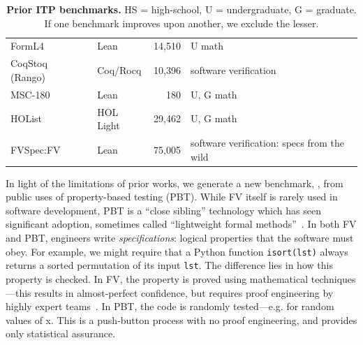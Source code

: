 \begin{table}[h]
\begin{tabularx}{\textwidth}{@{}
    >{\raggedright\arraybackslash}p{3.3cm}
    l
    r
    >{\raggedright\arraybackslash}X@{}}
FormL4~\cite{lu2024process}
  & Lean & 14{,}510 & U math \\
CoqStoq (Rango)~\cite{thompson2024rango}
  & Coq/Rocq & 10{,}396 & software verification \\
MSC-180~\cite{li2025msc}
  & Lean & 180 & U, G math \\
HOList~\cite{bansal2019holist}
  & HOL Light & 29{,}462 & U, G math \\
FVSpec:FV & Lean & 75{,}005 & software verification: specs from the wild \\ 
\bottomrule
\end{tabularx}
\caption{\textbf{Prior ITP benchmarks.} HS = high-school, U = undergraduate, G = graduate. If one benchmark improves upon another, we exclude the lesser.}
\label{tab:fv-benchmarks}
\end{table}

In light of the limitations of prior works, we generate a new benchmark, \FVSpec, from public uses of property-based testing (PBT). 
While FV itself is rarely used in software development, PBT is a ``close sibling'' technology which has seen significant adoption, sometimes called ``lightweight formal methods''~\cite{JacksonWing1996}. In both FV and PBT, engineers write \emph{specifications}: logical properties that the software must obey. For example, we might require that a Python function \texttt{isort(lst)} always returns a sorted permutation of its input \texttt{lst}. The difference lies in how this property is checked. In FV, the property is proved using mathematical techniques---this results in almost-perfect confidence, but requires proof engineering by highly expert teams~\cite{dodds2022formally}. In PBT, the code is randomly tested---e.g. for random values of x. This is a push-button process with no proof engineering, and provides only statistical assurance.




